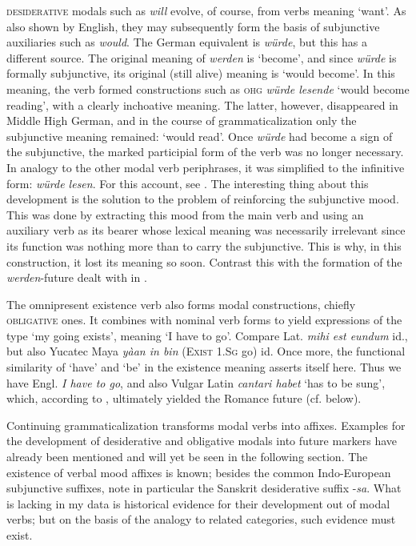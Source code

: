 \textsc{desiderative} modals such as \textit{will} evolve, of course, from verbs meaning ‘want’. As also shown by English, they may subsequently form the basis of subjunctive auxiliaries such as \textit{would}. The German equivalent is \textit{würde}, but this has a different source. The original meaning of \textit{werden} is ‘become’, and since \textit{würde} is formally subjunctive, its original (still alive) meaning is ‘would become’. In this meaning, the verb formed constructions such as \textsc{ohg} \textit{würde lesende} ‘would become reading’, with a clearly inchoative meaning. The latter, however, disappeared in Middle High German, and in the course of grammaticalization only the subjunctive meaning remained: ‘would read’. Once \textit{würde} had become a sign of the subjunctive, the marked participial form of the verb was no longer necessary. In analogy to the other modal verb periphrases, it was simplified to the infinitive form: \textit{würde lesen}. For this account, see \citet[60f]{Ronneberger-Sibold1980}. The interesting thing about this development is the solution to the problem of reinforcing the subjunctive mood. This was done by extracting this mood from the main verb and using an auxiliary verb as its bearer whose lexical meaning was necessarily irrelevant since its function was nothing more than to carry the subjunctive. This is why, in this construction, it lost its meaning so soon. Contrast this with the formation of the \textit{werden}{}-future dealt with in .

The omnipresent existence verb also forms modal constructions, chiefly \textsc{obligative} ones. It combines with nominal verb forms to yield expressions of the type ‘my going exists’, meaning ‘I have to go’. Compare Lat. \textit{mihi est eundum} id., but also Yucatec Maya \textit{yàan in bin} (\textsc{Exist} 1.\textsc{Sg} go) id. Once more, the functional similarity of ‘have’ and ‘be’ in the existence meaning asserts itself here. Thus we have Engl. \textit{I have to go}, and also Vulgar Latin \textit{cantari habet} ‘has to be sung’, which, according to \citet[§~\textsc{ii}]{Benveniste1968}, ultimately yielded the Romance future (cf. below).

Continuing grammaticalization transforms modal verbs into affixes. Examples for the development of desiderative and obligative modals into future markers have already been mentioned and will yet be seen in the following section. The existence of verbal mood affixes is known; besides the common Indo-European subjunctive suffixes, note in particular the Sanskrit desiderative suffix -\textit{sa}. What is lacking in my data is historical evidence for their development out of modal verbs; but on the basis of the analogy to related categories, such evidence must exist.


